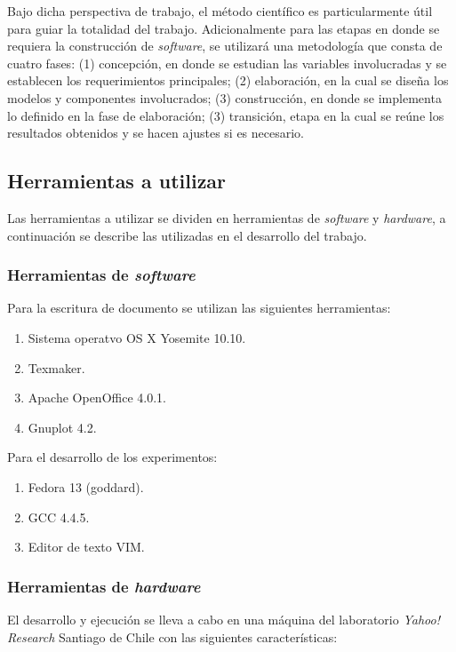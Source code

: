 Bajo dicha perspectiva de trabajo, el método científico es particularmente útil para guiar la totalidad del trabajo.
Adicionalmente para las etapas en donde se requiera la construcción de \textit{software}, se utilizará una metodología que consta de cuatro fases: (1) concepción, en donde se estudian las variables involucradas y se establecen los requerimientos principales; (2) elaboración, en la cual se diseña los modelos y componentes involucrados; (3) construcción, en donde se implementa lo definido en la fase de elaboración; (3) transición, etapa en la cual se reúne los resultados obtenidos y se hacen ajustes si es necesario.  

\subsection{Herramientas a utilizar}
\label{intro:herramientas}
Las herramientas a utilizar se dividen en herramientas de \textit{software} y \textit{hardware}, a continuación se describe las utilizadas en el desarrollo del trabajo.

\subsubsection{Herramientas de \textit{software}}
Para la escritura de documento se utilizan las siguientes herramientas: 

\begin{enumerate}
  \item Sistema operatvo OS X Yosemite 10.10.
  \item Texmaker.
  \item Apache OpenOffice 4.0.1.
  \item Gnuplot 4.2.  
\end{enumerate}

Para el desarrollo de los experimentos:

\begin{enumerate}
  \item Fedora 13 (goddard).
  \item GCC 4.4.5.
  \item Editor de texto VIM.
\end{enumerate}

\subsubsection{Herramientas de \textit{hardware}}
El desarrollo y ejecución se lleva a cabo en una máquina del laboratorio \textit{Yahoo!} \textit{Research} Santiago de Chile con las siguientes características: 

